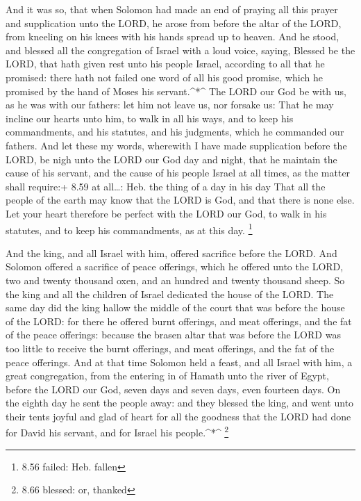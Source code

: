  And it was so, that when Solomon had made an end of
praying all this prayer and supplication unto the LORD, he arose from
before the altar of the LORD, from kneeling on his knees with his hands
spread up to heaven.  And he stood, and blessed all the
congregation of Israel with a loud voice, saying,  Blessed
be the LORD, that hath given rest unto his people Israel, according to
all that he promised: there hath not failed one word of all his good
promise, which he promised by the hand of Moses his servant.\^{}*\^{}
 The LORD our God be with us, as he was with our fathers:
let him not leave us, nor forsake us:  That he may incline
our hearts unto him, to walk in all his ways, and to keep his
commandments, and his statutes, and his judgments, which he commanded
our fathers.  And let these my words, wherewith I have made
supplication before the LORD, be nigh unto the LORD our God day and
night, that he maintain the cause of his servant, and the cause of his
people Israel at all times, as the matter shall require:+ 8.59 at
all\ldots: Heb. the thing of a day in his day  That all the
people of the earth may know that the LORD is God, and that there is
none else.  Let your heart therefore be perfect with the
LORD our God, to walk in his statutes, and to keep his commandments, as
at this day. \footnote{8.56 failed: Heb. fallen}

 And the king, and all Israel with him, offered sacrifice
before the LORD.  And Solomon offered a sacrifice of peace
offerings, which he offered unto the LORD, two and twenty thousand oxen,
and an hundred and twenty thousand sheep. So the king and all the
children of Israel dedicated the house of the LORD.  The
same day did the king hallow the middle of the court that was before the
house of the LORD: for there he offered burnt offerings, and meat
offerings, and the fat of the peace offerings: because the brasen altar
that was before the LORD was too little to receive the burnt offerings,
and meat offerings, and the fat of the peace offerings. 
And at that time Solomon held a feast, and all Israel with him, a great
congregation, from the entering in of Hamath unto the river of Egypt,
before the LORD our God, seven days and seven days, even fourteen days.
 On the eighth day he sent the people away: and they
blessed the king, and went unto their tents joyful and glad of heart for
all the goodness that the LORD had done for David his servant, and for
Israel his people.\^{}*\^{} \footnote{8.66 blessed: or, thanked}

